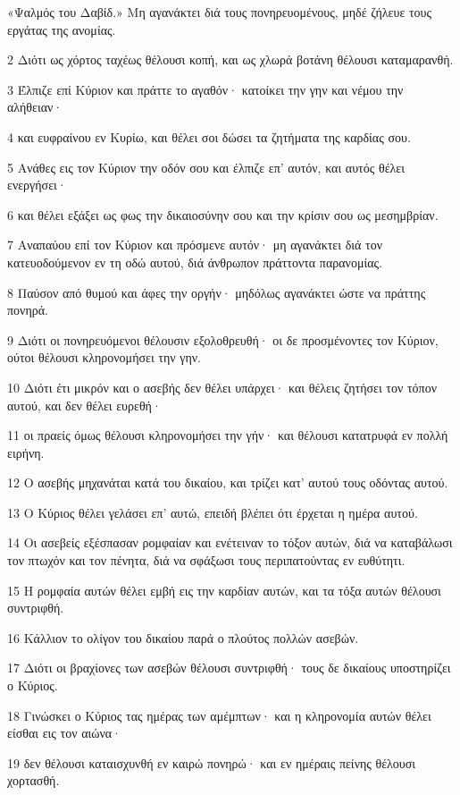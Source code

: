 \par «Ψαλμός του Δαβίδ.» Μη αγανάκτει διά τους πονηρευομένους, μηδέ ζήλευε τους εργάτας της ανομίας.
\par 2 Διότι ως χόρτος ταχέως θέλουσι κοπή, και ως χλωρά βοτάνη θέλουσι καταμαρανθή.
\par 3 Έλπιζε επί Κύριον και πράττε το αγαθόν· κατοίκει την γην και νέμου την αλήθειαν·
\par 4 και ευφραίνου εν Κυρίω, και θέλει σοι δώσει τα ζητήματα της καρδίας σου.
\par 5 Ανάθες εις τον Κύριον την οδόν σου και έλπιζε επ' αυτόν, και αυτός θέλει ενεργήσει·
\par 6 και θέλει εξάξει ως φως την δικαιοσύνην σου και την κρίσιν σου ως μεσημβρίαν.
\par 7 Αναπαύου επί τον Κύριον και πρόσμενε αυτόν· μη αγανάκτει διά τον κατευοδούμενον εν τη οδώ αυτού, διά άνθρωπον πράττοντα παρανομίας.
\par 8 Παύσον από θυμού και άφες την οργήν· μηδόλως αγανάκτει ώστε να πράττης πονηρά.
\par 9 Διότι οι πονηρευόμενοι θέλουσιν εξολοθρευθή· οι δε προσμένοντες τον Κύριον, ούτοι θέλουσι κληρονομήσει την γην.
\par 10 Διότι έτι μικρόν και ο ασεβής δεν θέλει υπάρχει· και θέλεις ζητήσει τον τόπον αυτού, και δεν θέλει ευρεθή·
\par 11 οι πραείς όμως θέλουσι κληρονομήσει την γήν· και θέλουσι κατατρυφά εν πολλή ειρήνη.
\par 12 Ο ασεβής μηχανάται κατά του δικαίου, και τρίζει κατ' αυτού τους οδόντας αυτού.
\par 13 Ο Κύριος θέλει γελάσει επ' αυτώ, επειδή βλέπει ότι έρχεται η ημέρα αυτού.
\par 14 Οι ασεβείς εξέσπασαν ρομφαίαν και ενέτειναν το τόξον αυτών, διά να καταβάλωσι τον πτωχόν και τον πένητα, διά να σφάξωσι τους περιπατούντας εν ευθύτητι.
\par 15 Η ρομφαία αυτών θέλει εμβή εις την καρδίαν αυτών, και τα τόξα αυτών θέλουσι συντριφθή.
\par 16 Κάλλιον το ολίγον του δικαίου παρά ο πλούτος πολλών ασεβών.
\par 17 Διότι οι βραχίονες των ασεβών θέλουσι συντριφθή· τους δε δικαίους υποστηρίζει ο Κύριος.
\par 18 Γινώσκει ο Κύριος τας ημέρας των αμέμπτων· και η κληρονομία αυτών θέλει είσθαι εις τον αιώνα·
\par 19 δεν θέλουσι καταισχυνθή εν καιρώ πονηρώ· και εν ημέραις πείνης θέλουσι χορτασθή.
